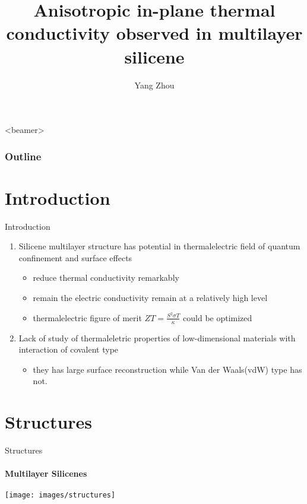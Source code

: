 \documentclass{beamer}
\title{Anisotropic in-plane thermal conductivity observed in multilayer silicene} %
\author{Yang Zhou}
\begin{document}
\frame{
\maketitle \\
{\color{white} \today}
}


\begin{frame}<beamer>
  \frametitle{Outline} %
  \tableofcontents
\end{frame}

\section{Introduction}
\begin{frame}[label=lists]{Introduction}

  \begin{enumerate}
    \item Silicene multilayer structure  has potential  in  thermalelectric field of quantum confinement and surface effects
          \begin{itemize}
            \item reduce thermal conductivity remarkably
          \end{itemize}
          \begin{itemize}
            \item remain the electric conductivity remain at a relatively high level
          \end{itemize}
          \begin{itemize}
            \item  thermalelectric figure of merit $ZT=\frac{S^2 \sigma T}{\kappa}$ could be optimized
          \end{itemize}

    \item Lack of study of thermaleletric properties of low-dimensional materials with interaction of covalent type
          \begin{itemize}
            \item they has large surface reconstruction while Van der Waals(vdW) type has not.
          \end{itemize}

  \end{enumerate}
  \bigskip
  \justifying

\end{frame}


\section{Structures}
\begin{frame}{Structures}
  \framesubtitle{Multilayer Silicenes}%
  \texttt{[image: images/structures]}
\end{frame}
\end{document}

